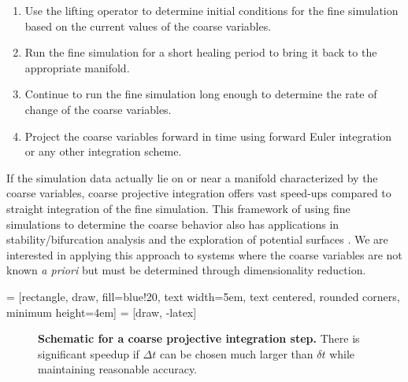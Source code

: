 \documentclass[12pt]{article}
\begin{document}
\begin{enumerate}
\item Use the lifting operator to determine initial conditions for the fine simulation based on the current values of the coarse variables.
\item Run the fine simulation for a short healing period to bring it back to the appropriate manifold.
\item Continue to run the fine simulation long enough to determine the rate of change of the coarse variables.
\item Project the coarse variables forward in time using forward Euler integration or any other integration scheme.
\end{enumerate}

If the simulation data actually lie on or near a manifold characterized by the coarse variables, coarse projective integration offers vast speed-ups compared to straight integration of the fine simulation. This framework of using fine simulations to determine the coarse behavior also has applications in stability/bifurcation analysis \cite{Theodoropoulos2000, Gear2002} and the exploration of potential surfaces \cite{Frewen2009}. We are interested in applying this approach to systems where the coarse variables are not known \textit{a priori} but must be determined through dimensionality reduction. \vspace{1mm}

 = [rectangle, draw, fill=blue!20, 
    text width=5em, text centered, rounded corners, minimum height=4em]
 = [draw, -latex]
\begin{figure}[h]
\caption{\textbf{Schematic for a coarse projective integration step.} There is significant speedup if $\Delta t$ can be chosen much larger than $\delta t$ while maintaining reasonable accuracy.}
\label{fig:cpi}
\end{figure}
\end{document}
